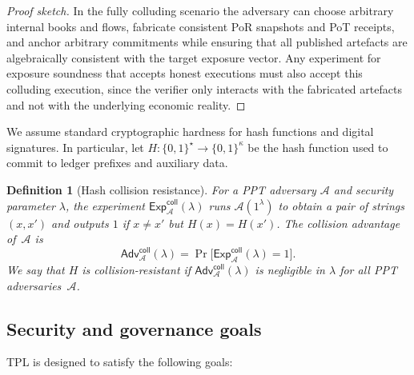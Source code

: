 \documentclass[11pt]{article}
\newtheorem{definition}{Definition}
\begin{document}
\begin{proof}[Proof sketch]
In the fully colluding scenario the adversary can choose arbitrary internal books and flows, fabricate consistent PoR snapshots and PoT receipts, and anchor arbitrary commitments while ensuring that all published artefacts are algebraically consistent with the target exposure vector.
Any experiment for exposure soundness that accepts honest executions must also accept this colluding execution, since the verifier only interacts with the fabricated artefacts and not with the underlying economic reality.
\end{proof}

We assume standard cryptographic hardness for hash functions and digital signatures.
In particular, let $H : \{0,1\}^\star \rightarrow \{0,1\}^\kappa$ be the hash function used to commit to ledger prefixes and auxiliary data.

\begin{definition}[Hash collision resistance]
\label{def:hash-coll}
For a PPT adversary $\mathcal{A}$ and security parameter $\lambda$, the experiment $\mathsf{Exp}^{\mathsf{coll}}_{\mathcal{A}}(\lambda)$ runs $\mathcal{A}(1^\lambda)$ to obtain a pair of strings $(x,x')$ and outputs $1$ if $x \neq x'$ but $H(x)=H(x')$.
The collision advantage of~$\mathcal{A}$ is
\[
  \mathsf{Adv}^{\mathsf{coll}}_{\mathcal{A}}(\lambda)
  = \Pr\big[\mathsf{Exp}^{\mathsf{coll}}_{\mathcal{A}}(\lambda)=1\big].
\]
We say that $H$ is collision-resistant if $\mathsf{Adv}^{\mathsf{coll}}_{\mathcal{A}}(\lambda)$ is negligible in $\lambda$ for all PPT adversaries~$\mathcal{A}$.
\end{definition}

\subsection{Security and governance goals}

TPL is designed to satisfy the following goals:
\end{document}
